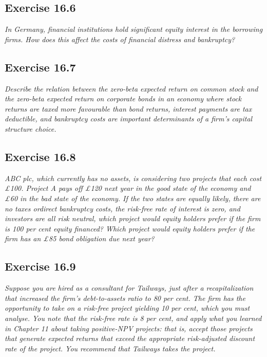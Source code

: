 \documentclass[]{book}
\theoremstyle{definition}
\theoremstyle{definition}
\theoremstyle{remark}
\begin{document}
\subsection{Exercise 16.6}\label{exercise-16.6}

\emph{In Germany, financial institutions hold significant equity
interest in the borrowing firms. How does this affect the costs of
financial distress and bankruptcy?} \citep[p.551]{book}

\subsection{Exercise 16.7}\label{exercise-16.7}

\emph{Describe the relation between the zero-beta expected return on
common stock and the zero-beta expected return on corporate bonds in an
economy where stock returns are taxed more favourable than bond returns,
interest payments are tax deductible, and bankruptcy costs are important
determinants of a firm's capital structure choice.} \citep[p.551]{book}

\subsection{Exercise 16.8}\label{exercise-16.8}

\emph{ABC plc, which currently has no assets, is considering two
projects that each cost £100. Project A pays off £120 next year in the
good state of the economy and £60 in the bad state of the economy. If
the two states are equally likely, there are no taxes ordirect
bankruptcy costs, the risk-free rate of interest is zero, and investors
are all risk neutral, which project would equity holders prefer if the
firm is 100 per cent equity financed? Which project would equity holders
prefer if the firm has an £85 bond obligation due next year?}
\citep[p.551-552]{book}

\subsection{Exercise 16.9}\label{exercise-16.9}

\emph{Suppose you are hired as a consultant for Tailways, just after a
recapitalization that increased the firm's debt-to-assets ratio to 80
per cent. The firm has the opportunity to take on a risk-free project
yielding 10 per cent, which you must analyse. You note that the
risk-free rate is 8 per cent, and apply what you learned in Chapter 11
about taking positive-NPV projects: that is, accept those projects that
generate expected returns that exceed the appropriate risk-adjusted
discount rate of the project. You recommend that Tailways takes the
project.} \citep[p.552]{book}
\end{document}
